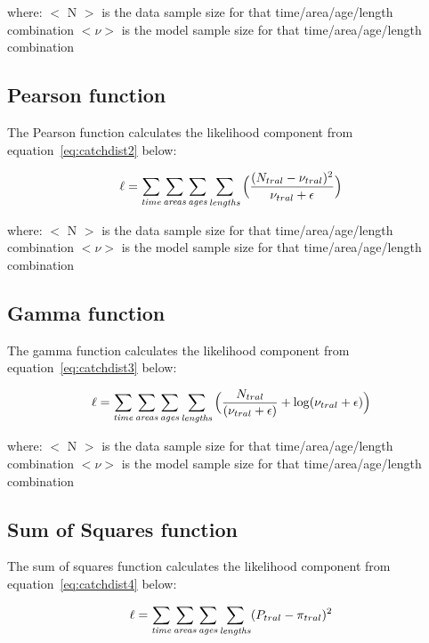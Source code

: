 \documentclass [a4paper, 10pt]{book}
\begin{document}
where:\newline
$<$ N $>$ is the data sample size for that time/area/age/length combination\newline
$<\nu>$ is the model sample size for that time/area/age/length combination

\subsection{Pearson function}
The Pearson function calculates the likelihood component from equation~\ref{eq:catchdist2} below:

\begin{equation}\label{eq:catchdist2}
\ell = \sum_{\it time}\sum_{\it areas}\sum_{\it ages}\sum_{\it lengths}\Big( {\frac{ ( N_{tral} - \nu_{tral} ) ^2} {\nu_{tral} + \epsilon}} \Big)
\end{equation}

where:\newline
$<$ N $>$ is the data sample size for that time/area/age/length combination\newline
$<\nu>$ is the model sample size for that time/area/age/length combination

\subsection{Gamma function}
The gamma function calculates the likelihood component from equation~\ref{eq:catchdist3} below:

\begin{equation}\label{eq:catchdist3}
\ell = \sum_{\it time}\sum_{\it areas}\sum_{\it ages}\sum_{\it lengths} \Big( {\frac{ N_{tral}} { (\nu_{tral} + \epsilon )} + \log ({\nu_{tral} + \epsilon}}) \Big)
\end{equation}

where:\newline
$<$ N $>$ is the data sample size for that time/area/age/length combination\newline
$<\nu>$ is the model sample size for that time/area/age/length combination

\subsection{Sum of Squares function}
The sum of squares function calculates the likelihood component from equation~\ref{eq:catchdist4} below:

\begin{equation}\label{eq:catchdist4}
\ell = \sum_{\it time}\sum_{\it areas}\sum_{\it ages}\sum_{\it lengths} ( P_{tral} - \pi_{tral} ) ^2
\end{equation}
\end{document}
